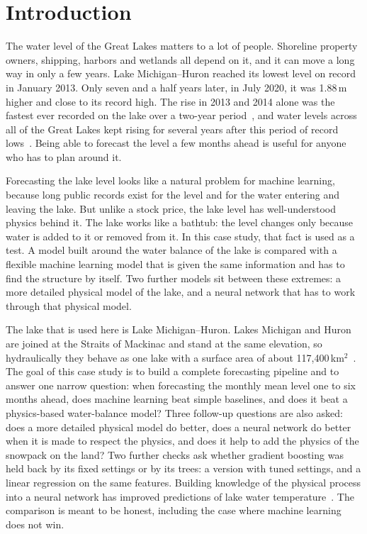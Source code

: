 \documentclass{article}
\begin{document}
\section{Introduction}

The water level of the Great Lakes matters to a lot of people. Shoreline property owners,
shipping, harbors and wetlands all depend on it, and it can move a long way in only a few years.
Lake Michigan--Huron reached its lowest level on record in January 2013. Only seven and a half
years later, in July 2020, it was 1.88\,m higher and close to its record high. The rise in 2013
and 2014 alone was the fastest ever recorded on the lake over a two-year
period~\cite{gronewold2016}, and water levels across all of the Great Lakes kept rising for
several years after this period of record lows~\cite{gronewold2019}. Being able to forecast the
level a few months ahead is useful for anyone who has to plan around it.

Forecasting the lake level looks like a natural problem for machine learning, because long
public records exist for the level and for the water entering and leaving the lake. But unlike
a stock price, the lake level has well-understood physics behind it. The lake works like a
bathtub: the level changes only because water is added to it or removed from it. In this case
study, that fact is used as a test. A model built around the water balance of the lake is
compared with a flexible machine learning model that is given the same information and has to
find the structure by itself. Two further models sit between these extremes: a more detailed
physical model of the lake, and a neural network that has to work through that physical model.

The lake that is used here is Lake Michigan--Huron. Lakes Michigan and Huron are joined at the
Straits of Mackinac and stand at the same elevation, so hydraulically they behave as one lake
with a surface area of about 117,400\,km$^2$~\cite{epa}. The goal of this case study is to build a complete
forecasting pipeline and to answer one narrow question: when forecasting the monthly mean level
one to six months ahead, does machine learning beat simple baselines, and does it beat a
physics-based water-balance model? Three follow-up questions are also asked: does a more detailed
physical model do better, does a neural network do better when it is made to respect the
physics, and does it help to add the physics of the snowpack on the land? Two further checks ask
whether gradient boosting was held back by its fixed settings or by its trees: a version with
tuned settings, and a linear regression on the same features. Building knowledge of
the physical process into a neural network has improved predictions of lake water
temperature~\cite{read2019}. The comparison is meant to be
honest, including the case where machine learning does not win.
\end{document}
